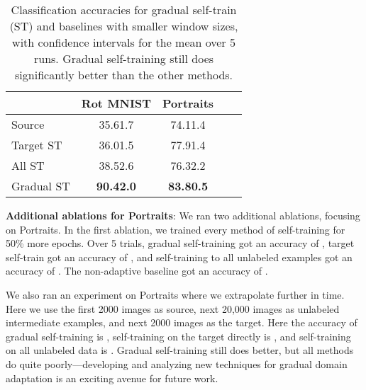 \documentclass[11pt]{article}
\begin{document}
\begin{table}[t]
\caption{
Classification accuracies for gradual self-train (ST) and baselines with smaller window sizes, with  confidence intervals for the mean over 5 runs. Gradual self-training still does significantly better than the other methods.
}
\label{tab:smallerWindowAblation}
\vskip 0.15in
\begin{center}
\begin{small}
\begin{sc}
\begin{tabular}{lcccr}
\toprule
 & Rot MNIST & Portraits \\
\midrule
Source      & 35.61.7 & 74.11.4 \\
Target ST   & 36.01.5 & 77.91.4 \\
All ST      & 38.52.6 & 76.32.2 \\
Gradual ST  & \textbf{90.42.0} & \textbf{83.80.5} \\
\bottomrule
\end{tabular}
\end{sc}
\end{small}
\end{center}
\vskip -0.1in
\end{table}

\textbf{Additional ablations for Portraits}: We ran two additional ablations, focusing on Portraits. In the first ablation, we trained every method of self-training for 50\% more epochs. Over 5 trials, gradual self-training got an accuracy of , target self-train got an accuracy of , and self-training to all unlabeled examples got an accuracy of . The non-adaptive baseline got an accuracy of .

We also ran an experiment on Portraits where we extrapolate further in time. Here we use the first 2000 images as source, next 20,000 images as unlabeled intermediate examples, and next 2000 images as the target. Here the accuracy of gradual self-training is , self-training on the target directly is , and self-training on all unlabeled data is . Gradual self-training still does better, but all methods do quite poorly---developing and analyzing new techniques for gradual domain adaptation is an exciting avenue for future work.


 
\end{document}
